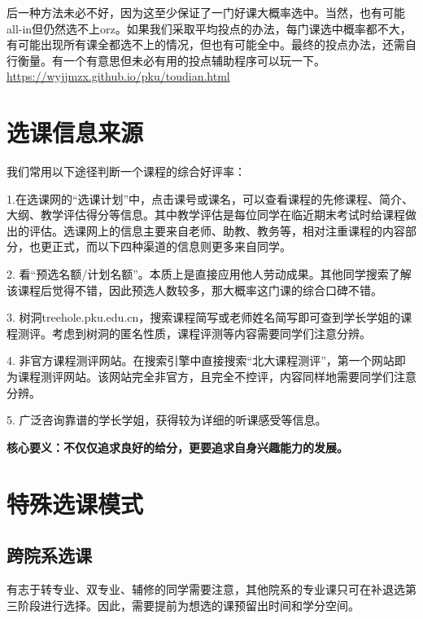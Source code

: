 \documentclass[11pt,oneside]{book}
\begin{document}
\vspace{10pt}

后一种方法未必不好，因为这至少保证了一门好课大概率选中。当然，也有可能all-in但仍然选不上orz。如果我们采取平均投点的办法，每门课选中概率都不大，有可能出现所有课全都选不上的情况，但也有可能全中。最终的投点办法，还需自行衡量。有一个有意思但未必有用的投点辅助程序可以玩一下。\href{https://wyjjmzx.github.io/pku/toudian.html}{https://wyjjmzx.github.io/pku/toudian.html}

\section{选课信息来源}
我们常用以下途径判断一个课程的综合好评率：

\vspace{10pt}

1.在选课网的“选课计划”中，点击课号或课名，可以查看课程的先修课程、简介、大纲、教学评估得分等信息。其中教学评估是每位同学在临近期末考试时给课程做出的评估。选课网上的信息主要来自老师、助教、教务等，相对注重课程的内容部分，也更正式，而以下四种渠道的信息则更多来自同学。

\vspace{10pt}

2. 看“预选名额/计划名额”。本质上是直接应用他人劳动成果。其他同学搜索了解该课程后觉得不错，因此预选人数较多，那大概率这门课的综合口碑不错。

\vspace{10pt}

3. 树洞treehole.pku.edu.cn，搜索课程简写或老师姓名简写即可查到学长学姐的课程测评。考虑到树洞的匿名性质，课程评测等内容需要同学们注意分辨。

\vspace{10pt}

4. 非官方课程测评网站。在搜索引擎中直接搜索“北大课程测评”，第一个网站即为课程测评网站。该网站完全非官方，且完全不控评，内容同样地需要同学们注意分辨。

\vspace{10pt}

5. 广泛咨询靠谱的学长学姐，获得较为详细的听课感受等信息。

\vspace{10pt}

\textbf{核心要义：不仅仅追求良好的给分，更要追求自身兴趣能力的发展。}

\section{特殊选课模式}
\subsection{跨院系选课}
有志于转专业、双专业、辅修的同学需要注意，其他院系的专业课只可在补退选第三阶段进行选择。因此，需要提前为想选的课预留出时间和学分空间。
\end{document}
